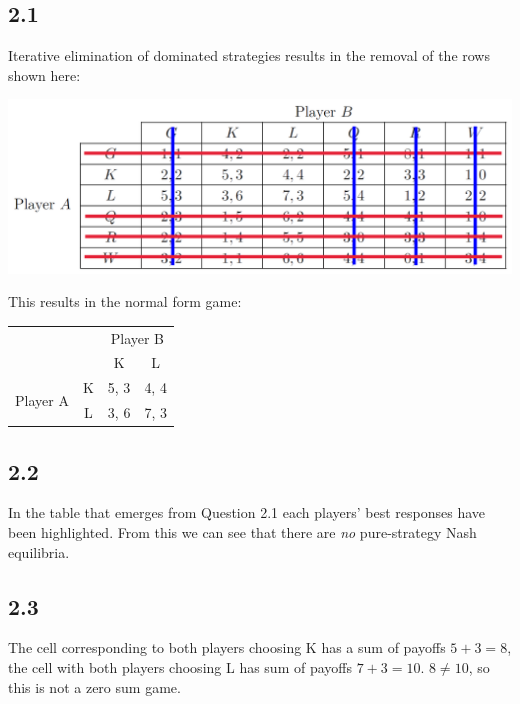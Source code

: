 \documentclass{article}
\begin{document}
\subsection*{2.1} Iterative elimination of dominated strategies results in the removal of the rows shown here:
\begin{center}
    \includegraphics[width=0.7\linewidth]{iterative-elimination.png}
\end{center}
This results in the normal form game:
\begin{table}[h!]
    \centering
    \begin{tabular}{cccc}
                                                   &                        & \multicolumn{2}{c}{Player B}                          \\ \cline{3-4} 
                                                   & \multicolumn{1}{c|}{}  & \multicolumn{1}{c|}{K}    & \multicolumn{1}{c|}{L}    \\ \cline{2-4} 
    \multicolumn{1}{c|}{\multirow{2}{*}{Player A}} & \multicolumn{1}{c|}{K} & \multicolumn{1}{c|}{{\color{red}5}, 3} & \multicolumn{1}{c|}{4, {\color{blue}4}} \\ \cline{2-4} 
    \multicolumn{1}{c|}{}                          & \multicolumn{1}{c|}{L} & \multicolumn{1}{c|}{3, {\color{blue}6}} & \multicolumn{1}{c|}{{\color{red}7}, 3} \\ \cline{2-4} 
    \end{tabular}
\end{table}

\subsection*{2.2}
In the table that emerges from Question 2.1 each players' best responses have been highlighted. From this we can see that there are \textit{no} pure-strategy Nash equilibria.

\subsection*{2.3}
The cell corresponding to both players choosing K has a sum of payoffs $5+3=8$, the cell with both players choosing L has sum of payoffs $7+3=10$. $8 \neq 10$, so this is not a zero sum game.
\end{document}
